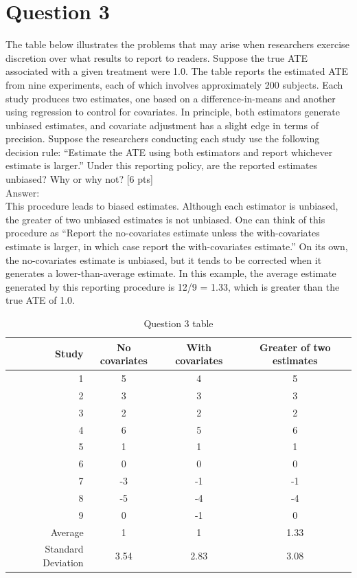 \documentclass[11pt,notitlepage]{article}\usepackage[]{graphicx}\usepackage[]{color}
\begin{document}
\section*{Question 3}
The table below illustrates the problems that may arise when researchers exercise discretion over what results to report to readers. Suppose the true ATE associated with a given treatment were 1.0. The table reports the estimated ATE from nine experiments, each of which involves approximately 200 subjects. Each study produces two estimates, one based on a difference-in-means and another using regression to control for covariates. In principle, both estimators generate unbiased estimates, and covariate adjustment has a slight edge in terms of precision. Suppose the researchers conducting each study use the following decision rule: ``Estimate the ATE using both estimators and report whichever estimate is larger.'' Under this reporting policy, are the reported estimates unbiased? Why or why not? [6 pts]\\
Answer:\\
This procedure leads to biased estimates. Although each estimator is unbiased, the greater of two unbiased estimates is not unbiased. One can think of this procedure as ``Report the no-covariates estimate unless the with-covariates estimate is larger, in which case report the with-covariates estimate.'' On its own, the no-covariates estimate is unbiased, but it tends to be corrected when it generates a lower-than-average estimate. In this example, the average estimate generated by this reporting procedure is 12/9 = 1.33, which is greater than the true ATE of 1.0.

\begin{table}[H]
  \centering
  \caption{Question 3 table}
    \begin{tabular}{r|cc|c}
    \toprule
   \multicolumn{1}{r}{Study} & No covariates & \multicolumn{1}{c}{With covariates} & \multicolumn{1}{c}{Greater of two estimates} \\
    \midrule
    1     & 5     & 4     & 5 \\
    2     & 3     & 3     & 3 \\
    3     & 2     & 2     & 2 \\
    4     & 6     & 5     & 6 \\
    5     & 1     & 1     & 1 \\
    6     & 0     & 0     & 0 \\
    7     & -3    & -1    & -1 \\
    8     & -5    & -4    & -4 \\
    9     & 0     & -1    & 0 \\ \midrule
    Average & 1     & 1     & 1.33 \\
    Standard Deviation & 3.54  & 2.83  & 3.08 \\
    \bottomrule
    \end{tabular}%
  \label{tab:addlabel}%
\end{table}%
\end{document}
